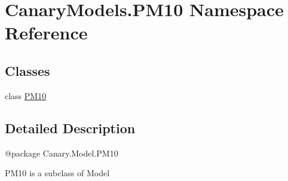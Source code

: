 \hypertarget{namespace_canary_models_1_1_p_m10}{\section{Canary\-Models.\-P\-M10 Namespace Reference}
\label{namespace_canary_models_1_1_p_m10}
}
\subsection*{Classes}
\begin{DoxyCompactItemize}
\item 
class \hyperlink{class_canary_models_1_1_p_m10_1_1_p_m10}{P\-M10}
\end{DoxyCompactItemize}


\subsection{Detailed Description}
\begin{DoxyVerb}@package Canary.Model.PM10

PM10 is a subclass of Model
\end{DoxyVerb}
 